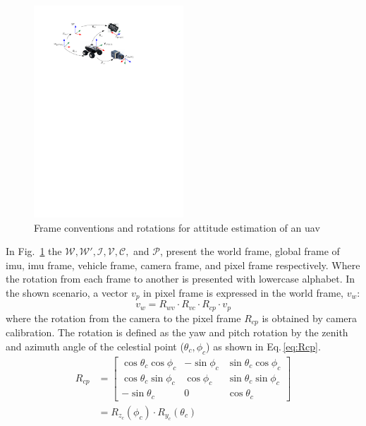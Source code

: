\begin{figure}[h]
  \centering
  \includegraphics[width=0.5\textwidth]{./content/intro/figures/conventions.pdf}
  \caption{Frame conventions and rotations for attitude estimation of an
    \gls{uav}}
  \label{fig:rotation}
\end{figure}
In Fig.~\ref{fig:rotation} the $\mathcal{W}, \mathcal{W'}, \mathcal{I},
\mathcal{V}, \mathcal{C},$ and $\mathcal{P}$, present the world frame, global
frame of \gls{imu}, \gls{imu} frame, vehicle frame, camera frame, and pixel
frame respectively. Where the rotation from each frame to another is presented
with lowercase alphabet.
In the shown scenario, a vector $v_{p}$ in pixel frame is
expressed in the world frame, $v_{w}$:
\begin{equation}
  \label{eq:vinW}
  v_{w} = R_{wv} \cdot R_{vc} \cdot R_{cp} \cdot v_{p}
\end{equation}
\noindent where the rotation from the camera to the pixel frame $R_{cp}$ is
obtained by camera calibration. The rotation is
defined as the yaw and pitch rotation by the zenith and azimuth angle of the
celestial point ($\theta_c, \phi_c$) as shown in Eq.\,\eqref{eq:Rcp}.
\begin{equation}
  \label{eq:Rcp}
  \begin{split}
  R_{cp}  & =
  \begin{bmatrix}
    \cos\theta_{c}\cos\phi_{c} & -\sin\phi_{c} & \sin\theta_{c}\cos\phi_{c}\\
    \cos\theta_{c}\sin\phi_{c} & \cos\phi_{c} & \sin\theta_{c}\sin\phi_{c}\\
    -\sin\theta_{c} & 0 & \cos\theta_{c}
  \end{bmatrix}
  \\
  & = R_{z_{c}}(\phi_{c})\cdot R_{y_{c}}(\theta_{c})
  \end{split}
\end{equation}

